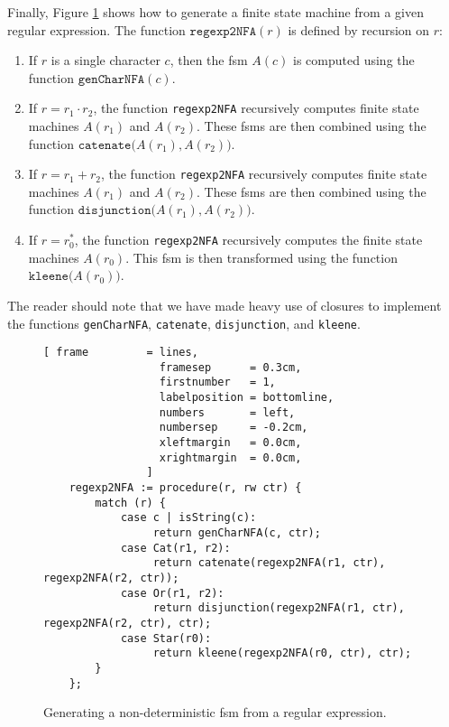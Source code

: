 Finally, Figure \ref{fig:regexp2NFA.stlx} shows how to generate a finite state machine
from a given regular expression.  The function $\texttt{regexp2NFA}(r)$ is defined by
recursion on $r$:
\begin{enumerate}
\item If $r$ is a single character $c$, then the fsm $A(c)$ is computed using
      the function $\texttt{genCharNFA}(c)$.
\item If $r = r_1 \cdot r_2$, the function \texttt{regexp2NFA} recursively computes
      finite state machines $A(r_1)$ and $A(r_2)$.  These fsms are then combined
      using the function $\texttt{catenate}\bigr(A(r_1), A(r_2)\bigr)$.
\item If $r = r_1 + r_2$, the function \texttt{regexp2NFA} recursively computes
      finite state machines $A(r_1)$ and $A(r_2)$.  These fsms are then combined
      using the function $\texttt{disjunction}\bigr(A(r_1), A(r_2)\bigr)$.
\item If $r = r_0^*$, the function \texttt{regexp2NFA} recursively computes
      the finite state machines $A(r_0)$.  This fsm is then transformed
      using the function $\texttt{kleene}\bigr(A(r_0)\bigr)$.
\end{enumerate}
The reader should note that we have made heavy use of closures to implement the functions
\texttt{genCharNFA}, \texttt{catenate}, \texttt{disjunction}, and \texttt{kleene}.

\begin{figure}[!ht]
\centering
\begin{Verbatim}[ frame         = lines, 
                  framesep      = 0.3cm, 
                  firstnumber   = 1,
                  labelposition = bottomline,
                  numbers       = left,
                  numbersep     = -0.2cm,
                  xleftmargin   = 0.0cm,
                  xrightmargin  = 0.0cm,
                ]
    regexp2NFA := procedure(r, rw ctr) {
        match (r) {
            case c | isString(c): 
                 return genCharNFA(c, ctr);
            case Cat(r1, r2):
                 return catenate(regexp2NFA(r1, ctr), regexp2NFA(r2, ctr)); 
            case Or(r1, r2):
                 return disjunction(regexp2NFA(r1, ctr), regexp2NFA(r2, ctr), ctr);
            case Star(r0):
                 return kleene(regexp2NFA(r0, ctr), ctr);
        }
    };
\end{Verbatim}
\vspace*{-0.3cm}
\caption{Generating a non-deterministic fsm from a regular expression.}
\label{fig:regexp2NFA.stlx}
\end{figure}



